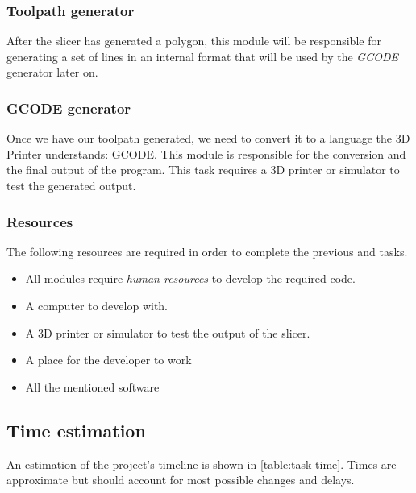\subsubsection{Toolpath generator}
After the slicer has generated a polygon, this module will be responsible for generating a set of lines in an internal format that will be used by the \emph{GCODE} generator later on.

\subsubsection{GCODE generator}
Once we have our toolpath generated, we need to convert it to a language the 3D Printer understands: GCODE. This module is responsible for the conversion and the final output of the program. This task requires a 3D printer or simulator to test the generated output.



\subsubsection{Resources}

The following resources are required in order to complete the previous and tasks.

\begin{itemize}
    \item All modules require \emph{human resources} to develop the required code.
    \item A computer to develop with.
    \item A 3D printer or simulator to test the output of the slicer.
    \item A place for the developer to work
    \item All the mentioned software
\end{itemize}


\subsection{Time estimation}
An estimation of the project's timeline is shown in \autoref{table:task-time}. Times are approximate but should account for most possible changes and delays.

